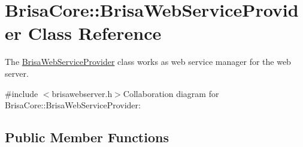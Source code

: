 \hypertarget{classBrisaCore_1_1BrisaWebServiceProvider}{
\section{BrisaCore::BrisaWebServiceProvider Class Reference}
\label{classBrisaCore_1_1BrisaWebServiceProvider}
}


The \hyperlink{classBrisaCore_1_1BrisaWebServiceProvider}{BrisaWebServiceProvider} class works as web service manager for the web server.  


{\ttfamily \#include $<$brisawebserver.h$>$}Collaboration diagram for BrisaCore::BrisaWebServiceProvider:\subsection*{Public Member Functions}
